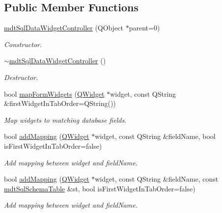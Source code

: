 \subsection*{Public Member Functions}
\begin{DoxyCompactItemize}
\item 
\hyperlink{classmdt_sql_data_widget_controller_a008f0693f9175266e4f8e473888c68e3}{mdt\-Sql\-Data\-Widget\-Controller} (Q\-Object $\ast$parent=0)
\begin{DoxyCompactList}\small\item\em Constructor. \end{DoxyCompactList}\item 
\hyperlink{classmdt_sql_data_widget_controller_aa571144f07b23c84755b249ad74e6f7f}{$\sim$mdt\-Sql\-Data\-Widget\-Controller} ()
\begin{DoxyCompactList}\small\item\em Destructor. \end{DoxyCompactList}\item 
bool \hyperlink{classmdt_sql_data_widget_controller_a2bec243fc6c4c908a9c984946919e244}{map\-Form\-Widgets} (\hyperlink{class_q_widget}{Q\-Widget} $\ast$widget, const Q\-String \&first\-Widget\-In\-Tab\-Order=Q\-String())
\begin{DoxyCompactList}\small\item\em Map widgets to matching database fields. \end{DoxyCompactList}\item 
bool \hyperlink{classmdt_sql_data_widget_controller_a8234727b0d1ef9b2350775d25b2b49fb}{add\-Mapping} (\hyperlink{class_q_widget}{Q\-Widget} $\ast$widget, const Q\-String \&field\-Name, bool is\-First\-Widget\-In\-Tab\-Order=false)
\begin{DoxyCompactList}\small\item\em Add mapping between widget and field\-Name. \end{DoxyCompactList}\item 
bool \hyperlink{classmdt_sql_data_widget_controller_a6a63b9b4d7e4c17e1fc257d43322763e}{add\-Mapping} (\hyperlink{class_q_widget}{Q\-Widget} $\ast$widget, const Q\-String \&field\-Name, const \hyperlink{classmdt_sql_schema_table}{mdt\-Sql\-Schema\-Table} \&st, bool is\-First\-Widget\-In\-Tab\-Order=false)
\begin{DoxyCompactList}\small\item\em Add mapping between widget and field\-Name. \end{DoxyCompactList}\end{DoxyCompactItemize}
